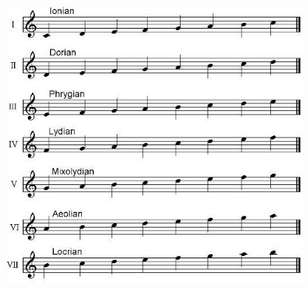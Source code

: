 \documentclass[pdftex,12pt,a4paper]{report}
\begin{document}
\begin{figure}[here]
  \centering
  \includegraphics[scale=2.7]{figure/cmajormodes.jpg}
  \label{fig:cmajormodes}
\end{figure}
\end{document}
